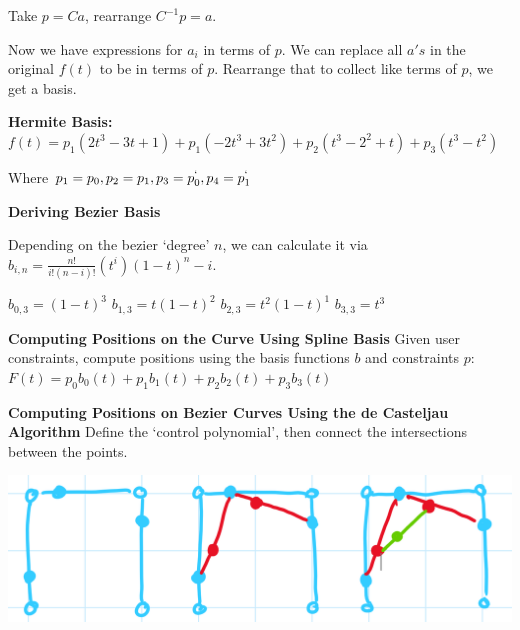 \documentclass[letterpaper, 8pt]{extarticle}
\begin{document}
\begin{multicols*}{4}
Take $p=Ca$, rearrange $C^{-1}p=a$.

Now we have expressions for $a_i$ in terms of $p$. We can replace all $a's$ in the original $f(t)$ to be in terms of $p$. Rearrange that to collect like terms of $p$, we get a basis.

\textbf{Hermite Basis:}
$f(t) = p_1(2t^3 - 3t + 1) + p_1(-2t^3+3t^2) + p_2(t^3-2^2 + t) + p_3(t^3-t^2)$

Where $p_1 = p_0, p_2 = p_1, p_3 = p^`_0, p_4 = p^`_1$


\textbf{Deriving Bezier Basis}

Depending on the bezier `degree' $n$, we can calculate it via $b_{i,n} = \frac{n!}{i!(n-i)!}(t^i)(1-t)^n-i$.

$b_{0,3} = (1-t)^3$
$b_{1,3} = t(1-t)^2$
$b_{2,3} = t^2(1-t)^1$
$b_{3,3} = t^3$


\textbf{Computing Positions on the Curve Using Spline Basis}
Given user constraints, compute positions using the basis functions $b$ and constraints $p$: $F(t) = p_0b_0(t) + p_1b_1(t) + p_2b_2(t) + p_3b_3(t)$

\textbf{Computing Positions on Bezier Curves Using the de Casteljau Algorithm}
Define the `control polynomial', then connect the intersections between the points.

\includegraphics[width=0.5\linewidth]{bezier.png}


\end{multicols*}
\end{document}
